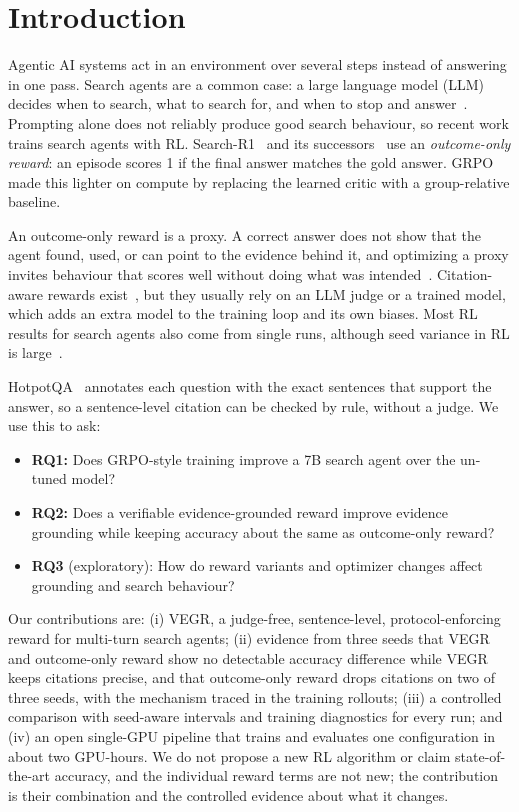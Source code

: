 \documentclass[conference]{IEEEtran}
\begin{document}
\section{Introduction}

Agentic AI systems act in an environment over several steps instead of answering in one pass. Search agents are a common case: a large language model (LLM) decides when to search, what to search for, and when to stop and answer~\cite{yao2023react}. Prompting alone does not reliably produce good search behaviour, so recent work trains search agents with RL. Search-R1~\cite{jin2025searchr1} and its successors~\cite{song2025r1searcher,chen2025research,zheng2025deepresearcher} use an \emph{outcome-only reward}: an episode scores 1 if the final answer matches the gold answer. GRPO~\cite{shao2024deepseekmath,deepseek2025r1} made this lighter on compute by replacing the learned critic with a group-relative baseline.

An outcome-only reward is a proxy. A correct answer does not show that the agent found, used, or can point to the evidence behind it, and optimizing a proxy invites behaviour that scores well without doing what was intended~\cite{skalse2022reward,gao2023overoptimization}. Citation-aware rewards exist~\cite{zhang2026carr,huang2024citations}, but they usually rely on an LLM judge or a trained model, which adds an extra model to the training loop and its own biases. Most RL results for search agents also come from single runs, although seed variance in RL is large~\cite{henderson2018matters,agarwal2021precipice}.

HotpotQA~\cite{yang2018hotpotqa} annotates each question with the exact sentences that support the answer, so a sentence-level citation can be checked by rule, without a judge. We use this to ask:
\begin{itemize}
\item \textbf{RQ1:} Does GRPO-style training improve a 7B search agent over the un-tuned model?
\item \textbf{RQ2:} Does a verifiable evidence-grounded reward improve evidence grounding while keeping accuracy about the same as outcome-only reward?
\item \textbf{RQ3} (exploratory): How do reward variants and optimizer changes affect grounding and search behaviour?
\end{itemize}

Our contributions are: (i) VEGR, a judge-free, sentence-level, protocol-enforcing reward for multi-turn search agents; (ii) evidence from three seeds that VEGR and outcome-only reward show no detectable accuracy difference while VEGR keeps citations precise, and that outcome-only reward drops citations on two of three seeds, with the mechanism traced in the training rollouts; (iii) a controlled comparison with seed-aware intervals and training diagnostics for every run; and (iv) an open single-GPU pipeline that trains and evaluates one configuration in about two GPU-hours. We do not propose a new RL algorithm or claim state-of-the-art accuracy, and the individual reward terms are not new; the contribution is their combination and the controlled evidence about what it changes.
\end{document}
